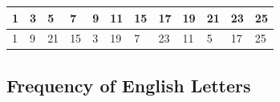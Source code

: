 \documentclass{article}
\numberwithin{figure}{section}
\numberwithin{equation}{section}
\begin{document}
\vspace{0.2cm}

\begin{center}
\begin{tabular}{|m{9.675pt}|m{9.675pt}|m{9.675pt}|m{9.675pt}|m{9.675pt}|m{9.675pt}|m{9.675pt}|m{9.675pt}|m{9.675pt}|m{9.675pt}|m{9.675pt}|m{9.675pt}|}
\hline
1 &3 &5 &7 &9 &11 &15 &17 &19 &21 &23 &25 \\
\hline
1 &9 &21 &15 &3 &19 &7 &23 &11 &5 &17 &25 \\
\hline
\end{tabular}
\end{center}

\newpage

\subsection*{Frequency of English Letters}
\end{document}
